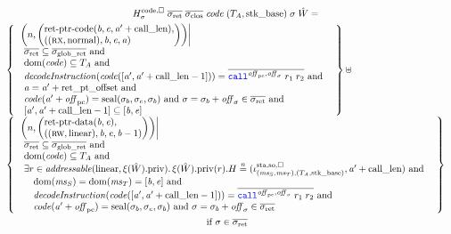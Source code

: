 \documentclass[a4paper]{article}
\begin{document}
\begin{multline*}
  H^\mathrm{code,\square}_\sigma \; \sigrets \; \sigcloss \; \code \;
  (\ta,\stkb) \; \sigma \; \hat{W}= \\
  \begin{array}[t]{l}
\left\{
    \begin{array}{l}
\left. \npair{\arraycolsep=0pt\left(\array{l}\retptrc(\baddr,\eaddr,\aaddr'+\calllen),\\((\rx,\normal),\baddr,\eaddr,\aaddr)\endarray\right)} \middle| \right. \\
      \begin{array}{l}
        \sigrets \subseteq \gsigrets \tand \\
        \dom(\code) \subseteq \ta \tand\\
        \decInstr{\code([\aaddr',\aaddr' + \calllen-1])} = \overline{\scall{\offpc,\offsigma}{r_1}{r_2}} \tand \\
        \aaddr = \aaddr' + \retoffset \tand \\
        \code(\aaddr'+\offpc) = \seal{\sigma_b,\sigma_e,\sigma_b} \tand \sigma = \sigma_b + \offsigma \in \sigrets \tand\\
        \lbrack \aaddr',\aaddr' + \calllen -1 \rbrack \subseteq \lbrack \baddr, \eaddr \rbrack
      \end{array}
    \end{array}
      \right\} \uplus \\
\left\{
    \begin{array}{l}
\left. \npair{\arraycolsep=0pt\left(\array{l}\retptrd(\baddr,\eaddr),\\((\rw,\linear),\baddr,\eaddr,\baddr-1)\endarray\right)} \middle| \right. \\
      \begin{array}{l}
        \sigrets \subseteq \gsigrets \tand \\
        \dom(\code) \subseteq \ta \tand\\
        \exists r \in \addressable{\linear,\pwpriv[\xi(\hat{W})]} \ldotp \pwpriv[\xi(\hat{W})](r).H \nequal (\stareg[(\ms_S,\ms_T),(\ta,\stkb)]{\spao,\square}, \aaddr'+\calllen) \tand \\
        \quad \dom(\ms_S) = \dom(\ms_T) = [\baddr,\eaddr] \tand\\
        \quad \decInstr{\code([\aaddr',\aaddr' + \calllen-1])} = \overline{\scall{\offpc,\offsigma}{r_1}{r_2}} \tand \\
        \quad \code(\aaddr'+\offpc) = \seal{\sigma_b,\sigma_e,\sigma_b} \tand \sigma = \sigma_b + \offsigma \in \sigrets
      \end{array}
    \end{array}
    \right\} \\
  \end{array}\\
    \text{ if } \sigma \in \sigrets\\
\end{multline*}
\end{document}
